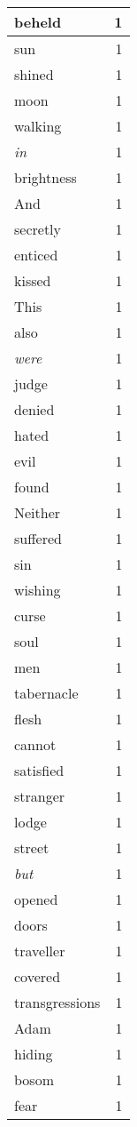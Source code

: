 \begin{center}
\begin{longtable}{l|r}
beheld & 1 \\ \hline
sun & 1 \\ \hline
shined & 1 \\ \hline
moon & 1 \\ \hline
walking & 1 \\ \hline
\emph{in} & 1 \\ \hline
brightness & 1 \\ \hline
And & 1 \\ \hline
secretly & 1 \\ \hline
enticed & 1 \\ \hline
kissed & 1 \\ \hline
This & 1 \\ \hline
also & 1 \\ \hline
\emph{were} & 1 \\ \hline
judge & 1 \\ \hline
denied & 1 \\ \hline
hated & 1 \\ \hline
evil & 1 \\ \hline
found & 1 \\ \hline
Neither & 1 \\ \hline
suffered & 1 \\ \hline
sin & 1 \\ \hline
wishing & 1 \\ \hline
curse & 1 \\ \hline
soul & 1 \\ \hline
men & 1 \\ \hline
tabernacle & 1 \\ \hline
flesh & 1 \\ \hline
cannot & 1 \\ \hline
satisfied & 1 \\ \hline
stranger & 1 \\ \hline
lodge & 1 \\ \hline
street & 1 \\ \hline
\emph{but} & 1 \\ \hline
opened & 1 \\ \hline
doors & 1 \\ \hline
traveller & 1 \\ \hline
covered & 1 \\ \hline
transgressions & 1 \\ \hline
Adam & 1 \\ \hline
hiding & 1 \\ \hline
bosom & 1 \\ \hline
fear & 1 \\ \hline

\end{longtable}
\end{center}
